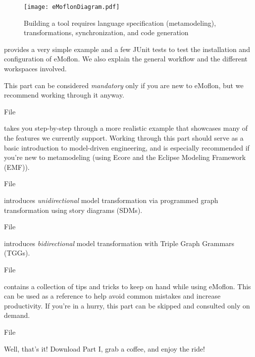 \begin{figure}[htbp]
	\centering
  \texttt{[image: eMoflonDiagram.pdf]}
	\caption{Building a tool requires language specification (metamodeling), transformations, synchronization, and code generation}
	\label{fig:transformationModel}
\end{figure}
\begin{description}

\pagebreak

\item[Part I: Installation and set up] provides a very simple example and a few JUnit tests to test the installation and configuration of eMoflon.
We also explain the general workflow and the different workspaces involved.

This part can be considered \emph{mandatory} only if you are new to eMoflon, but we recommend working through it anyway.

{\footnotesize File \dlPartOne}

\item[Part II: Ecore] takes you step-by-step through a more realistic example that showcases many of the features we currently support.
Working through this part should serve as a basic introduction to model-driven engineering, and is especially recommended if you're new to metamodeling
(using Ecore and the Eclipse Modeling Framework (EMF)).

{\footnotesize File \dlPartTwo}

\item[Part III: Story Driven Modelling (SDM)] introduces \emph{unidirectional} mo\-del transformation via programmed graph transformation using story diagrams (SDMs).

{\footnotesize File \dlPartThree}

\item[Part IV: TGGs] introduces \emph{bidirectional} model transformation with Triple Graph Grammars (TGGs).

{\footnotesize File \dlPartFour}

\item[Part V: Miscellaneous] contains a collection of tips and tricks to keep
on hand while using eMoflon. This can be used as a reference to help avoid common mistakes and increase productivity. If you're in a hurry, this part can be skipped and consulted only on demand.

{\footnotesize File \dlPartFive}

\end{description}

Well, that's it! Download Part I, grab a coffee, and enjoy the ride!
